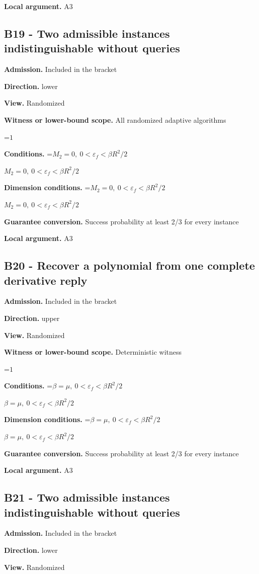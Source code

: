 \documentclass[10pt,a4paper]{article}
\newcommand{\AtlasMath}[1]{\par\begingroup\centering\setbox0=\hbox{$\displaystyle #1$}\ifdim\wd0>1.4\linewidth\typeout{ATLAS WIDE FORMULA: \the\wd0}\fi\ifdim\wd0>\linewidth\resizebox{\linewidth}{!}{\box0}\else\box0\fi\par\endgroup}
\newcommand{\AtlasInlineMath}[1]{\begingroup\setbox0=\hbox{$#1$}\ifdim\wd0>.4\linewidth\endgroup\AtlasMath{#1}\else\endgroup$#1$\fi}
\begin{document}
\textbf{Local argument.} A3

\subsection{B19 - Two admissible instances indistinguishable without queries}
\textbf{Admission.} Included in the bracket

\textbf{Direction.} lower

\textbf{View.} Randomized

\textbf{Witness or lower-bound scope.} All randomized adaptive algorithms

\AtlasMath{1}
\textbf{Conditions.} \AtlasInlineMath{M_2=0,\ 0<\varepsilon_f<\beta R^2/2}

\textbf{Dimension conditions.} \AtlasInlineMath{M_2=0,\ 0<\varepsilon_f<\beta R^2/2}

\textbf{Guarantee conversion.} Success probability at least 2/3 for every instance

\textbf{Local argument.} A3

\subsection{B20 - Recover a polynomial from one complete derivative reply}
\textbf{Admission.} Included in the bracket

\textbf{Direction.} upper

\textbf{View.} Randomized

\textbf{Witness or lower-bound scope.} Deterministic witness

\AtlasMath{1}
\textbf{Conditions.} \AtlasInlineMath{\beta=\mu,\ 0<\varepsilon_f<\beta R^2/2}

\textbf{Dimension conditions.} \AtlasInlineMath{\beta=\mu,\ 0<\varepsilon_f<\beta R^2/2}

\textbf{Guarantee conversion.} Success probability at least 2/3 for every instance

\textbf{Local argument.} A3

\subsection{B21 - Two admissible instances indistinguishable without queries}
\textbf{Admission.} Included in the bracket

\textbf{Direction.} lower

\textbf{View.} Randomized
\end{document}
